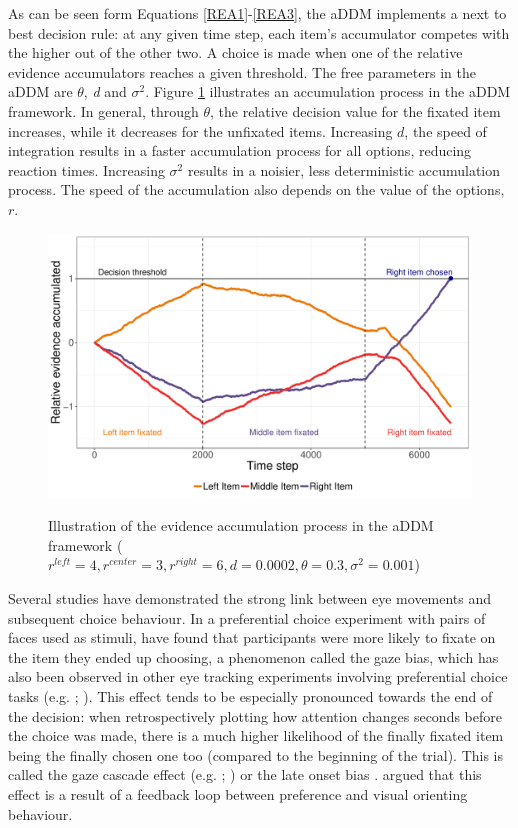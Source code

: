 \documentclass[11pt,a4paper]{article}
\begin{document}
As can be seen form Equations \ref{REA1}-\ref{REA3}, the aDDM implements a next to best decision rule: at any given time step, each item's accumulator competes with the higher out of the other two. A choice is made when one of the relative evidence accumulators reaches a given threshold. The free parameters in the aDDM are $\theta$, \textit{d} and $\sigma^{2}$. Figure \ref{fig:driftrates} illustrates an accumulation process in the aDDM framework. In general, through $\theta$, the relative decision value for the fixated item increases, while it decreases for the unfixated items. Increasing $d$, the speed of integration results in a faster accumulation process for all options, reducing reaction times. Increasing $\sigma^{2}$ results in a noisier, less deterministic accumulation process. The speed of the accumulation also depends on the value of the options, $r$. 

\begin{figure}
\captionsetup{justification=centering}
\caption{Illustration of the evidence accumulation process in the aDDM framework
($\mathit{\mathit{r^{left}=4, r^{center}=3, r^{right}=6, d=0.0002}, \theta=0.3, \sigma^{2}=0.001}$)}
\includegraphics[width=1\textwidth]{./c1_driftrates.pdf}
\label{fig:driftrates}
\end{figure}

 Several studies have demonstrated the strong link between eye movements and subsequent choice behaviour. In a preferential choice experiment with pairs of faces used as stimuli,  have found that participants were more likely to fixate on the item they ended up choosing, a phenomenon called the gaze bias, which has also been observed in other eye tracking experiments involving preferential choice tasks (e.g. ; ). This effect tends to be especially pronounced towards the end of the decision: when retrospectively plotting how attention changes seconds before the choice was made, there is a much higher likelihood of the finally fixated item being the finally chosen one too (compared to the beginning of the trial). This is called the gaze cascade effect (e.g. ; ) or the late onset bias \cite{Mullett2016}.  argued that this effect is a result of a feedback loop between preference and visual orienting behaviour. 
\end{document}
